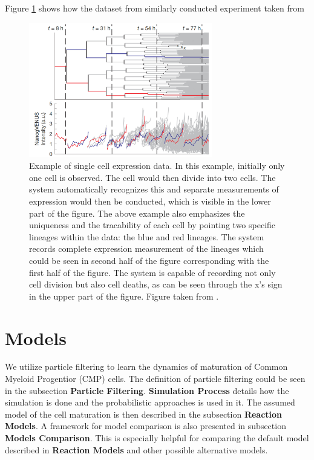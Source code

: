\documentclass{bioinfo}
\begin{document}
Figure \ref{fig:02} shows how the dataset from similarly conducted experiment taken from \citealp{Feigelman16}

\begin{figure}[h]
\includegraphics[width=8cm]{figures/cell-generations.png}
\caption{Example of single cell expression data. In this example, initially only one cell is observed. The cell would then divide into two cells. The system automatically recognizes this and separate measurements of expression would then be conducted, which is visible in the lower part of the figure. The above example also emphasizes the uniqueness and the tracability of each cell by pointing two specific lineages within the data: the blue and red lineages. The system records complete expression measurement of the lineages which could be seen in second half of the figure corresponding with the first half of the figure. The system is capable of recording not only cell division but also cell deaths, as can be seen through the x's sign in the upper part of the figure. Figure taken from \citealp{Feigelman16}.}\label{fig:02}
\end{figure}

\section{Models}

We utilize particle filtering to learn the dynamics of maturation of Common Myeloid Progentior (CMP) cells. The definition of particle filtering could be seen in the subsection \textbf{Particle Filtering}. \textbf{Simulation Process} details how the simulation is done and the probabilistic approaches is used in it. The assumed model of the cell maturation is then described in the subsection \textbf{Reaction Models}. A framework for model comparison is also presented in subsection \textbf{Models Comparison}. This is especially helpful for comparing the default model described in \textbf{Reaction Models} and other possible alternative models.
\end{document}
